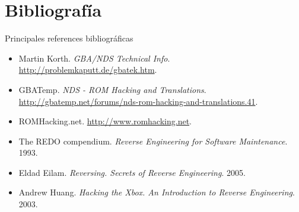 
\section{Bibliografía}
\begin{frame}{Principales references bibliográficas}
\begin{itemize}
    \item<1-> Martin Korth. \textit{GBA/NDS Technical Info}. {\footnotesize\url{http://problemkaputt.de/gbatek.htm}}.

    \item<2-> GBATemp. \textit{NDS - ROM Hacking and Translations}. {\footnotesize\url{http://gbatemp.net/forums/nds-rom-hacking-and-translations.41}}.

    \item<3-> ROMHacking.net. {\footnotesize\url{http://www.romhacking.net}}.

    \item<4-> The REDO compendium. \textit{Reverse Engineering for Software Maintenance}. 1993.

    \item<5-> Eldad Eilam. \textit{Reversing. Secrets of Reverse Engineering}. 2005.

    \item<6-> Andrew Huang. \textit{Hacking the Xbox. An Introduction to Reverse Engineering}. 2003.
\end{itemize}
\end{frame}
